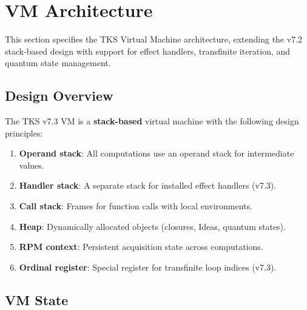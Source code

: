 \section{VM Architecture}
\label{sec:vm-architecture}

This section specifies the TKS Virtual Machine architecture, extending the v7.2 stack-based design with support for effect handlers, transfinite iteration, and quantum state management.

\subsection{Design Overview}
\label{subsec:vm-design-overview}

\begin{definition}
\label{def:vm-principles}
The TKS v7.3 VM is a \textbf{stack-based} virtual machine with the following design principles:
\begin{enumerate}
  \item \textbf{Operand stack}: All computations use an operand stack for intermediate values.
  \item \textbf{Handler stack}: A separate stack for installed effect handlers (v7.3).
  \item \textbf{Call stack}: Frames for function calls with local environments.
  \item \textbf{Heap}: Dynamically allocated objects (closures, Ideas, quantum states).
  \item \textbf{RPM context}: Persistent acquisition state across computations.
  \item \textbf{Ordinal register}: Special register for transfinite loop indices (v7.3).
\end{enumerate}
\end{definition}

\subsection{VM State}
\label{subsec:vm-state}

